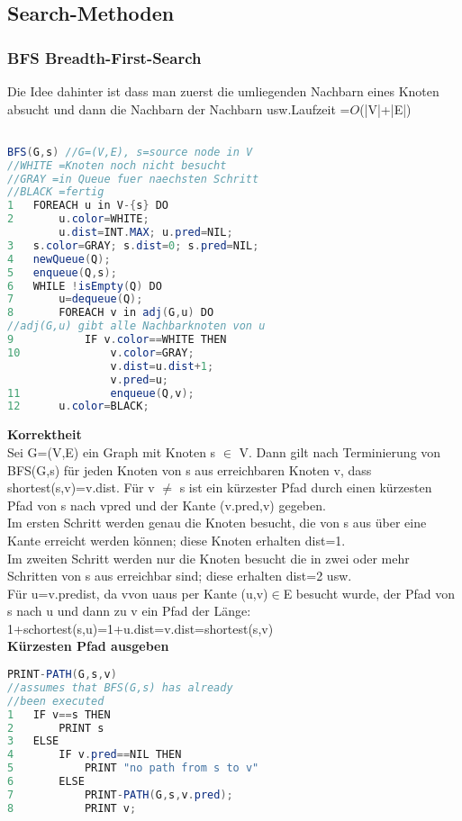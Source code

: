 \documentclass[jou,apacite]{apa6}
\begin{document}
\subsection{Search-Methoden}
\subsubsection{BFS Breadth-First-Search}
Die Idee dahinter ist dass man zuerst die umliegenden Nachbarn eines Knoten absucht und dann die Nachbarn der Nachbarn usw.Laufzeit =$O$(|V|+|E|)
\begin{lstlisting}[language=java]

BFS(G,s) //G=(V,E), s=source node in V
//WHITE =Knoten noch nicht besucht
//GRAY =in Queue fuer naechsten Schritt
//BLACK =fertig
1   FOREACH u in V-{s} DO
2       u.color=WHITE; 
        u.dist=INT.MAX; u.pred=NIL;
3   s.color=GRAY; s.dist=0; s.pred=NIL;
4   newQueue(Q);
5   enqueue(Q,s);
6   WHILE !isEmpty(Q) DO
7       u=dequeue(Q);
8       FOREACH v in adj(G,u) DO 
//adj(G,u) gibt alle Nachbarknoten von u
9           IF v.color==WHITE THEN
10              v.color=GRAY; 
                v.dist=u.dist+1;
                v.pred=u;
11              enqueue(Q,v);
12      u.color=BLACK;

\end{lstlisting}
{\bfseries Korrektheit }\\
Sei G=(V,E) ein Graph mit Knoten s $\in$ V. Dann gilt nach Terminierung von BFS(G,s) für jeden Knoten
von s aus erreichbaren Knoten v, dass shortest(s,v)=v.dist. Für v $\neq$ s ist ein kürzester Pfad durch einen kürzesten Pfad von s nach vpred und der Kante (v.pred,v) gegeben. \\
Im ersten Schritt werden genau  die Knoten besucht,  die von s aus über eine Kante erreicht werden können; diese Knoten erhalten dist=1.\\
Im zweiten Schritt werden nur die Knoten besucht die in zwei oder mehr Schritten von s aus erreichbar sind; diese erhalten dist=2 usw. \\
Für u=v.predist, da vvon uaus per Kante (u,v)$\in$E besucht wurde, der Pfad von s nach u und dann zu v ein Pfad der Länge: \\
1+schortest(s,u)=1+u.dist=v.dist=shortest(s,v)\\
{\bfseries Kürzesten Pfad ausgeben}
\begin{lstlisting}[language=java]
PRINT-PATH(G,s,v)
//assumes that BFS(G,s) has already 
//been executed
1   IF v==s THEN
2       PRINT s
3   ELSE
4       IF v.pred==NIL THEN
5           PRINT "no path from s to v"
6       ELSE
7           PRINT-PATH(G,s,v.pred);
8           PRINT v;
\end{lstlisting}
\end{document}
